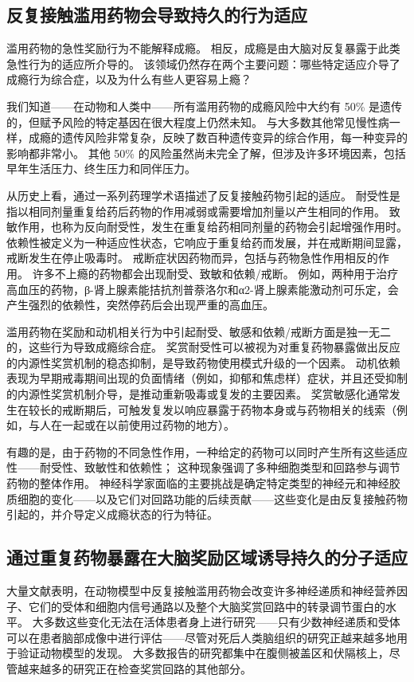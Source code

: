 \subsection{反复接触滥用药物会导致持久的行为适应}

滥用药物的急性奖励行为不能解释成瘾。 相反，成瘾是由大脑对反复暴露于此类急性行为的适应所介导的。 该领域仍然存在两个主要问题：哪些特定适应介导了成瘾行为综合症，以及为什么有些人更容易上瘾？

我们知道——在动物和人类中——所有滥用药物的成瘾风险中大约有 50\% 是遗传的，但赋予风险的特定基因在很大程度上仍然未知。 与大多数其他常见慢性病一样，成瘾的遗传风险非常复杂，反映了数百种遗传变异的综合作用，每一种变异的影响都非常小。 其他 50\% 的风险虽然尚未完全了解，但涉及许多环境因素，包括早年生活压力、终生压力和同伴压力。

从历史上看，通过一系列药理学术语描述了反复接触药物引起的适应。 耐受性是指以相同剂量重复给药后药物的作用减弱或需要增加剂量以产生相同的作用。 致敏作用，也称为反向耐受性，发生在重复给药相同剂量的药物会引起增强作用时。 依赖性被定义为一种适应性状态，它响应于重复给药而发展，并在戒断期间显露，戒断发生在停止吸毒时。 戒断症状因药物而异，包括与药物急性作用相反的作用。 许多不上瘾的药物都会出现耐受、致敏和依赖/戒断。 例如，两种用于治疗高血压的药物，β-肾上腺素能拮抗剂普萘洛尔和α2-肾上腺素能激动剂可乐定，会产生强烈的依赖性，突然停药后会出现严重的高血压。

滥用药物在奖励和动机相关行为中引起耐受、敏感和依赖/戒断方面是独一无二的，这些行为导致成瘾综合症。 奖赏耐受性可以被视为对重复药物暴露做出反应的内源性奖赏机制的稳态抑制，是导致药物使用模式升级的一个因素。 动机依赖表现为早期戒毒期间出现的负面情绪（例如，抑郁和焦虑样）症状，并且还受抑制的内源性奖赏机制介导，是推动重新吸毒或复发的主要因素。 奖赏敏感化通常发生在较长的戒断期后，可触发复发以响应暴露于药物本身或与药物相关的线索（例如，与人在一起或在以前使用过药物的地方）。

有趣的是，由于药物的不同急性作用，一种给定的药物可以同时产生所有这些适应性——耐受性、致敏性和依赖性； 这种现象强调了多种细胞类型和回路参与调节药物的整体作用。 神经科学家面临的主要挑战是确定特定类型的神经元和神经胶质细胞的变化——以及它们对回路功能的后续贡献——这些变化是由反复接触药物引起的，并介导定义成瘾状态的行为特征。

\subsection{通过重复药物暴露在大脑奖励区域诱导持久的分子适应}
大量文献表明，在动物模型中反复接触滥用药物会改变许多神经递质和神经营养因子、它们的受体和细胞内信号通路以及整个大脑奖赏回路中的转录调节蛋白的水平。 大多数这些变化无法在活体患者身上进行研究——只有少数神经递质和受体可以在患者脑部成像中进行评估——尽管对死后人类脑组织的研究正越来越多地用于验证动物模型的发现。 大多数报告的研究都集中在腹侧被盖区和伏隔核上，尽管越来越多的研究正在检查奖赏回路的其他部分。

